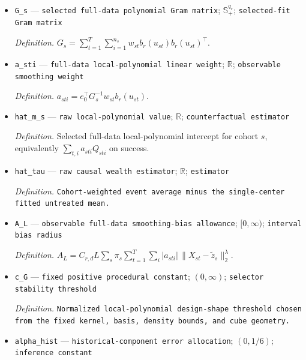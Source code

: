 \documentclass{article}
\begin{document}
\begin{itemize}
  \par\smallskip\noindent\emph{Definition.} \(L_s=\sum_{t=1}^{T}\sum_{i=1}^{n_s}w_{st}\).
  \item \texttt{G\_\allowbreak{}s} --- \texttt{selected full-\allowbreak{}data polynomial Gram matrix}; \(\mathbb S_+^{q_r}\); \texttt{selected-\allowbreak{}fit Gram matrix}
  \par\smallskip\noindent\emph{Definition.} \(G_s=\sum_{t=1}^{T}\sum_{i=1}^{n_s}w_{st}b_r(u_{st})b_r(u_{st})^\top\).
  \item \texttt{a\_\allowbreak{}sti} --- \texttt{full-\allowbreak{}data local-\allowbreak{}polynomial linear weight}; \(\mathbb R\); \texttt{observable smoothing weight}
  \par\smallskip\noindent\emph{Definition.} \(a_{sti}=e_0^\top G_s^{-1}w_{st}b_r(u_{st})\).
  \item \texttt{hat\_\allowbreak{}m\_\allowbreak{}s} --- \texttt{raw local-\allowbreak{}polynomial value}; \(\mathbb R\); \texttt{counterfactual estimator}
  \par\smallskip\noindent\emph{Definition.} Selected full-data local-polynomial intercept for cohort \(s\), equivalently \(\sum_{t,i}a_{sti}Q_{sti}\) on success.
  \item \texttt{hat\_\allowbreak{}tau} --- \texttt{raw causal wealth estimator}; \(\mathbb R\); \texttt{estimator}
  \par\smallskip\noindent\emph{Definition.} \texttt{Cohort-\allowbreak{}weighted event average minus the single-\allowbreak{}center fitted untreated mean.}
  \item \texttt{A\_\allowbreak{}L} --- \texttt{observable full-\allowbreak{}data smoothing-\allowbreak{}bias allowance}; \([0,\infty)\); \texttt{interval bias radius}
  \par\smallskip\noindent\emph{Definition.} \(A_L=C_{r,d}L\sum_s\pi_s\sum_{t=1}^{T}\sum_i|a_{sti}|\,\|X_{st}-\widetilde z_s\|_2^\lambda\).
  \item \texttt{c\_\allowbreak{}G} --- \texttt{fixed positive procedural constant}; \((0,\infty)\); \texttt{selector stability threshold}
  \par\smallskip\noindent\emph{Definition.} \texttt{Normalized local-\allowbreak{}polynomial design-\allowbreak{}shape threshold chosen from the fixed kernel,\allowbreak{} basis,\allowbreak{} density bounds,\allowbreak{} and cube geometry.}
  \item \texttt{alpha\_\allowbreak{}hist} --- \texttt{historical-\allowbreak{}component error allocation}; \((0,1/6)\); \texttt{inference constant}

\end{itemize}
\end{document}
